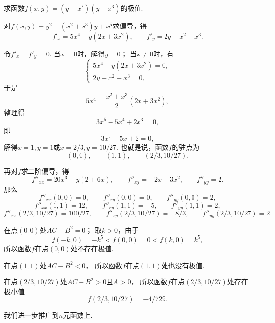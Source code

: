 \begin{example}
求函数\(f(x,y) = (y-x^2)(y-x^3)\)的极值.
\begin{solution}
对\(f(x,y) = y^2 - (x^2+x^3) y + x^5\)求偏导，得\[
	f'_x = 5x^4 - y(2x+3x^2),
	\qquad
	f'_y = 2y - x^2 - x^3.
\]

令\(f'_x = f'_y = 0\).
当\(x=0\)时，解得\(y = 0\)；
当\(x\neq0\)时，有\[
	\begin{cases}
		5x^4-y(2x+3x^2) = 0, \\
		2y-x^2+x^3 = 0,
	\end{cases}
\]
于是\[
	5x^4 = \frac{x^2+x^3}{2}(2x+3x^2),
\]
整理得\[
	3x^5-5x^4+2x^3=0,
\]
即\[
	3x^2-5x+2=0,
\]
解得\(x=1,y=1\)或\(x=2/3,y=10/27\).
也就是说，函数\(f\)的驻点为\[
	(0,0), \qquad
	(1,1), \qquad
	(2/3,10/27).
\]

再对\(f\)求二阶偏导，得\[
	f''_{xx} = 20x^3 - y(2+6x),
	\qquad
	f''_{xy} = -2x-3x^2,
	\qquad
	f''_{yy} = 2.
\]
那么
\[
	f''_{xx}(0,0) = 0,
	\qquad
	f''_{xy}(0,0) = 0,
	\qquad
	f''_{yy}(0,0) = 2,
\]\[
	f''_{xx}(1,1) = 12,
	\qquad
	f''_{xy}(1,1) = -5,
	\qquad
	f''_{yy}(1,1) = 2,
\]\[
	f''_{xx}(2/3,10/27) = 100/27,
	\qquad
	f''_{xy}(2/3,10/27) = -8/3,
	\qquad
	f''_{yy}(2/3,10/27) = 2.
\]

在点\((0,0)\)处\(AC-B^2 = 0\)；
取\(k>0\)，由于\[
f(-k,0) = -k^5 < f(0,0) = 0 < f(k,0) = k^5,
\]所以函数\(f\)在点\((0,0)\)处不存在极值.

在点\((1,1)\)处\(AC-B^2 < 0\)，
所以函数\(f\)在点\((1,1)\)处也没有极值.

在点\((2/3,10/27)\)处\(AC-B^2 > 0\)且\(A>0\)，
所以函数\(f\)在点\((2/3,10/27)\)处存在极小值\[
	f(2/3,10/27) = -4/729.
\]
\end{solution}
\end{example}

我们进一步推广到\(n\)元函数上.
\begingroup
\def\x{\mat{X}}
\def\X#1{\x_{#1}}
\def\z{\mat{0}}

